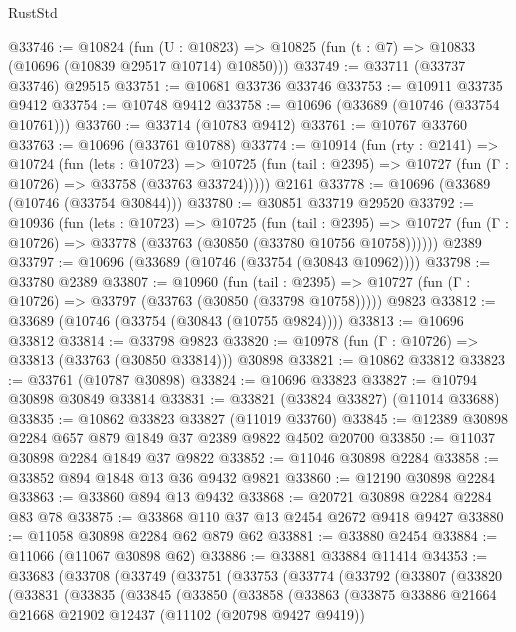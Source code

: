 \begin{lexlean}{RustStd}
\begin{coremodule}
@33746 := @10824
    (fun (U : @10823) => @10825 (fun (t : @7) => @10833 (@10696 (@10839 @29517 @10714) @10850)))
@33749 := @33711 (@33737 @33746) @29515
@33751 := @10681 @33736 @33746
@33753 := @10911 @33735 @9412
@33754 := @10748 @9412
@33758 := @10696 (@33689 (@10746 (@33754 @10761)))
@33760 := @33714 (@10783 @9412)
@33761 := @10767 @33760
@33763 := @10696 (@33761 @10788)
@33774 := @10914
    (fun (rty : @2141) =>
    @10724
      (fun (lets : @10723) =>
      @10725 (fun (tail : @2395) => @10727 (fun (Γ : @10726) => @33758 (@33763 @33724)))))
    @2161
@33778 := @10696 (@33689 (@10746 (@33754 @30844)))
@33780 := @30851 @33719 @29520
@33792 := @10936
    (fun (lets : @10723) =>
    @10725
      (fun (tail : @2395) =>
      @10727 (fun (Γ : @10726) => @33778 (@33763 (@30850 (@33780 @10756 @10758))))))
    @2389
@33797 := @10696 (@33689 (@10746 (@33754 (@30843 @10962))))
@33798 := @33780 @2389
@33807 := @10960
    (fun (tail : @2395) => @10727 (fun (Γ : @10726) => @33797 (@33763 (@30850 (@33798 @10758)))))
    @9823
@33812 := @33689 (@10746 (@33754 (@30843 (@10755 @9824))))
@33813 := @10696 @33812
@33814 := @33798 @9823
@33820 := @10978 (fun (Γ : @10726) => @33813 (@33763 (@30850 @33814))) @30898
@33821 := @10862 @33812
@33823 := @33761 (@10787 @30898)
@33824 := @10696 @33823
@33827 := @10794 @30898 @30849 @33814
@33831 := @33821 (@33824 @33827) (@11014 @33688)
@33835 := @10862 @33823 @33827 (@11019 @33760)
@33845 := @12389 @30898 @2284 @657 @879 @1849 @37 @2389 @9822 @4502 @20700
@33850 := @11037 @30898 @2284 @1849 @37 @9822
@33852 := @11046 @30898 @2284
@33858 := @33852 @894 @1848 @13 @36 @9432 @9821
@33860 := @12190 @30898 @2284
@33863 := @33860 @894 @13 @9432
@33868 := @20721 @30898 @2284 @2284 @83 @78
@33875 := @33868 @110 @37 @13 @2454 @2672 @9418 @9427
@33880 := @11058 @30898 @2284 @62 @879 @62
@33881 := @33880 @2454
@33884 := @11066 (@11067 @30898 @62)
@33886 := @33881 @33884 @11414
@34353 := @33683
    (@33708
      (@33749
        (@33751
          (@33753
            (@33774
              (@33792
                (@33807
                  (@33820
                    (@33831
                      (@33835
                        (@33845
                          (@33850
                            (@33858
                              (@33863
                                (@33875
                                  @33886
                                  @21664
                                  @21668
                                  @21902
                                  @12437
                                  (@11102 (@20798 @9427 @9419))

\end{coremodule}
\end{lexlean}

